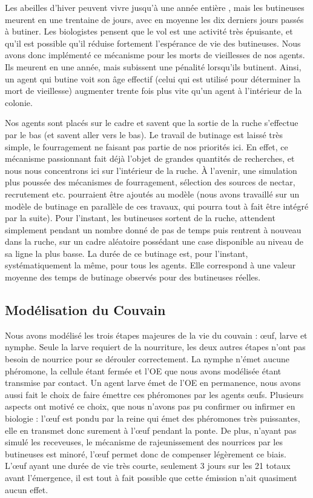 		Les abeilles d'hiver peuvent vivre jusqu'à une année entière \cite{mattila_timing_2001}, mais les butineuses meurent en une trentaine de jours, avec en moyenne les dix derniers jours passés à butiner. Les biologistes pensent que le vol est une activité très épuisante, et qu'il est possible qu'il réduise fortement l'espérance de vie des butineuses. Nous avons donc implémenté ce mécanisme pour les morts de vieillesses de nos agents. Ils meurent en une année, mais subissent une pénalité lorsqu'ils butinent. Ainsi, un agent qui butine voit son âge effectif (celui qui est utilisé pour déterminer la mort de vieillesse) augmenter trente fois plus vite qu'un agent à l'intérieur de la colonie.
		
		Nos agents sont placés sur le cadre et savent que la sortie de la ruche s'effectue par le bas (et savent aller vers le bas). Le travail de butinage est laissé très simple, le fourragement ne faisant pas partie de nos priorités ici. En effet, ce mécanisme passionnant fait déjà l'objet de grandes quantités de recherches, et nous nous concentrons ici sur l'intérieur de la ruche. À l'avenir, une simulation plus poussée des mécanismes de fourragement, sélection des sources de nectar, recrutement etc. pourraient être ajoutés au modèle (nous avons travaillé sur un modèle de butinage \cite{bajo_toward_2018,riviere_modemulti-agent_2021} en parallèle de ces travaux, qui pourra tout à fait être intégré par la suite). Pour l'instant, les butineuses sortent de la ruche, attendent simplement pendant un nombre donné de pas de temps puis rentrent à nouveau dans la ruche, sur un cadre aléatoire possédant une case disponible au niveau de sa ligne la plus basse. La durée de ce butinage est, pour l'instant, systématiquement la même, pour tous les agents. Elle correspond à une valeur moyenne des temps de butinage observés pour des butineuses réelles.
		
		
		\subsection{Modélisation du Couvain}
		
			Nous avons modélisé les trois étapes majeures de la vie du couvain : œuf, larve et nymphe. Seule la larve requiert de la nourriture, les deux autres étapes n'ont pas besoin de nourrice pour se dérouler correctement. La nymphe n'émet aucune phéromone, la cellule étant fermée et l'OE que nous avons modélisée étant transmise par contact. Un agent larve émet de l'OE en permanence, nous avons aussi fait le choix de faire émettre ces phéromones par les agents œufs. Plusieurs aspects ont motivé ce choix, que nous n'avons pas pu confirmer ou infirmer en biologie : l'œuf est pondu par la reine qui émet des phéromones très puissantes, elle en transmet donc surement à l'œuf pendant la ponte. De plus, n'ayant pas simulé les receveuses, le mécanisme de rajeunissement des nourrices par les butineuses est minoré, l'œuf permet donc de compenser légèrement ce biais. L'œuf ayant une durée de vie très courte, seulement 3 jours sur les 21 totaux avant l'émergence, il est tout à fait possible que cette émission n'ait quasiment aucun effet.
			

